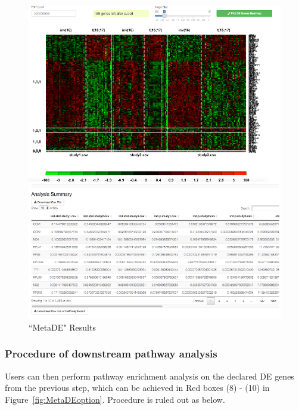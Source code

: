 \begin{figure}[H]
\begin{center}
\includegraphics[scale=0.7]{./figure/metaDE/metaDEresult.pdf}
\caption{``MetaDE" Results}
\label{fig:MetaDEresult1}
\end{center}
\end{figure}

\subsubsection{Procedure of downstream pathway analysis}
Users can then perform pathway enrichment analysis on the declared DE genes from the previous step, 
which can be achieved in {\color{red} Red boxes (8) - (10)} in Figure~\ref{fig:MetaDEoption}.
Procedure is ruled out as below.

